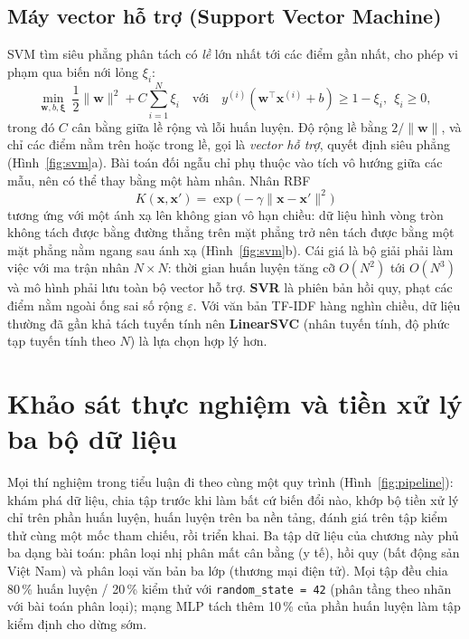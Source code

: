 \subsection{Máy vector hỗ trợ (Support Vector Machine)}

SVM \cite{cortes1995} tìm siêu phẳng phân tách có \emph{lề} lớn nhất tới các điểm gần nhất, cho phép vi phạm qua biến
nới lỏng $\xi_i$:
\begin{equation}
  \min_{\mathbf{w}, b, \boldsymbol{\xi}}\ \frac{1}{2}\lVert\mathbf{w}\rVert^2 + C\sum_{i=1}^{N}\xi_i
  \quad\text{với}\quad y^{(i)}(\mathbf{w}^\top\mathbf{x}^{(i)} + b) \ge 1 - \xi_i,\ \ \xi_i \ge 0 ,
\end{equation}
trong đó $C$ cân bằng giữa lề rộng và lỗi huấn luyện. Độ rộng lề bằng $2/\lVert\mathbf{w}\rVert$, và chỉ các điểm nằm
trên hoặc trong lề, gọi là \emph{vector hỗ trợ}, quyết định siêu phẳng (Hình~\ref{fig:svm}a). Bài toán đối ngẫu chỉ phụ
thuộc vào tích vô hướng giữa các mẫu, nên có thể thay bằng một hàm nhân. Nhân RBF
\begin{equation}
  K(\mathbf{x}, \mathbf{x}') = \exp\!\big(-\gamma\lVert\mathbf{x} - \mathbf{x}'\rVert^2\big)
\end{equation}
tương ứng với một ánh xạ lên không gian vô hạn chiều: dữ liệu hình vòng tròn không tách được bằng đường thẳng trên mặt
phẳng trở nên tách được bằng một mặt phẳng nằm ngang sau ánh xạ (Hình~\ref{fig:svm}b). Cái giá là bộ giải phải làm việc
với ma trận nhân $N \times N$: thời gian huấn luyện tăng cỡ $O(N^2)$ tới $O(N^3)$ và mô hình phải lưu toàn bộ vector hỗ
trợ. \textbf{SVR} là phiên bản hồi quy, phạt các điểm nằm ngoài ống sai số rộng $\varepsilon$. Với văn bản TF-IDF hàng
nghìn chiều, dữ liệu thường đã gần khả tách tuyến tính nên \textbf{LinearSVC} (nhân tuyến tính, độ phức tạp tuyến tính
theo $N$) là lựa chọn hợp lý hơn.


\section{Khảo sát thực nghiệm và tiền xử lý ba bộ dữ liệu}
\label{sec:data2}

Mọi thí nghiệm trong tiểu luận đi theo cùng một quy trình (Hình~\ref{fig:pipeline}): khám phá dữ liệu, chia tập trước khi
làm bất cứ biến đổi nào, khớp bộ tiền xử lý chỉ trên phần huấn luyện, huấn luyện trên ba nền tảng, đánh giá trên tập kiểm
thử cùng một mốc tham chiếu, rồi triển khai. Ba tập dữ liệu của chương này phủ ba dạng bài toán: phân loại nhị phân mất cân
bằng (y tế), hồi quy (bất động sản Việt Nam) và phân loại văn bản ba lớp (thương mại điện tử). Mọi tập đều chia
80\,\% huấn luyện / 20\,\% kiểm thử với \texttt{random\_state = 42} (phân tầng theo nhãn với bài toán phân loại); mạng MLP
tách thêm 10\,\% của phần huấn luyện làm tập kiểm định cho dừng sớm.

